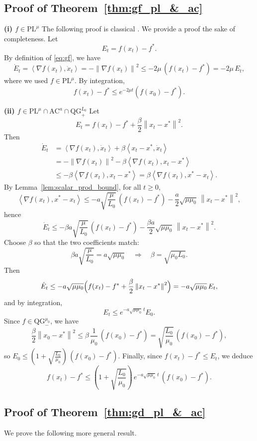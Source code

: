 \documentclass{article}
\def\pl{{\text{PL}^\mu}}
\newcommand{\bpar}[1]{\left(#1\right)}
\newcommand{\norm}[1]{\left\lVert#1\right\rVert}
\newcommand{\dotprod}[1]{\left< #1\right>}
\newcommand{\ac}{\text{AC}^{a}}
\newcommand{\qg}{\text{QG}_{+}^{L_0}}
\newcommand{\qginff}[1]{\text{QG}_{-}^{#1}}
\theoremstyle{plain}
\theoremstyle{definition}
\theoremstyle{remark}
\begin{document}
\subsection{Proof of Theorem~\ref{thm:gf_pl_&_ac}}\label{app:gf_pl_&_ac}


\textbf{(i) $f \in \pl$ \:} The following proof is classical \cite{polyak2017lyapunov}. We provide a proof the sake of completeness.
Let
\[
E_t = f(x_t)-f^\ast.
\]
By definition of \eqref{eq:gf}, we have
\[
\dot E_t = \dotprod{\nabla f(x_t),\dot x_t}
= -\norm{\nabla f(x_t)}^2
\le -2\mu\,(f(x_t)-f^\ast)
= -2\mu\,E_t,
\]
where we used $f\in\pl$. By integration,
\[
f(x_t)-f^\ast \le e^{-2\mu t}(f(x_0)-f^\ast).
\]

\textbf{(ii) $f \in \pl \cap \ac \cap \qg$ \:}
Let
\[
E_t = f(x_t)-f^\ast + \frac{\beta}{2}\norm{x_t-x^\ast}^2.
\]
Then
\begin{align*}
\dot E_t
&= \dotprod{\nabla f(x_t),\dot x_t} + \beta \dotprod{x_t-x^\ast,\dot x_t}\\
&= -\norm{\nabla f(x_t)}^2 - \beta \dotprod{\nabla f(x_t),x_t-x^\ast}\\
&\le - \beta \dotprod{\nabla f(x_t),x_t-x^\ast}
= \beta \dotprod{\nabla f(x_t),x^\ast-x_t}.
\end{align*}
By Lemma~\ref{lem:scalar_prod_bound}, for all $t\ge 0$,
\[
\dotprod{\nabla f(x_t),x^\ast-x_t}
\le -a\sqrt{\frac{\mu}{L_0}}\,(f(x_t)-f^\ast)
     -\frac{a}{2}\sqrt{\mu\mu_0}\,\norm{x_t-x^\ast}^2,
\]
hence
\[
\dot E_t \le
-\beta a\sqrt{\frac{\mu}{L_0}}\,(f(x_t)-f^\ast)
-\frac{\beta a}{2}\sqrt{\mu\mu_0}\,\norm{x_t-x^\ast}^2.
\]
Choose $\beta$ so that the two coefficients match:
\[
\beta a\sqrt{\frac{\mu}{L_0}} = a\sqrt{\mu\mu_0}
\quad\Longrightarrow\quad
\beta = \sqrt{\mu_0 L_0}.
\]
Then
\[
\dot E_t \le -a\sqrt{\mu\mu_0}\Bigl(f(x_t)-f^\ast + \frac{\beta}{2}\norm{x_t-x^\ast}^2\Bigr)
= -a\sqrt{\mu\mu_0}\,E_t,
\]
and by integration,
\[
E_t \le e^{-a\sqrt{\mu\mu_0}\,t}E_0.
\]
Since $f\in\qginff{\mu_0}$, we have
\[
\frac{\beta}{2}\norm{x_0-x^\ast}^2
\le \beta\,\frac{1}{\mu_0}\,(f(x_0)-f^\ast)
= \sqrt{\frac{L_0}{\mu_0}}\,(f(x_0)-f^\ast),
\]
so $E_0 \le \bpar{1+\sqrt{\frac{L_0}{\mu_0}}}\,(f(x_0)-f^\ast)$.
Finally, since $f(x_t)-f^\ast\le E_t$, we deduce
\[
f(x_t)-f^\ast
\le \bpar{1+\sqrt{\frac{L_0}{\mu_0}}}\,e^{-a\sqrt{\mu\mu_0}\,t}\,(f(x_0)-f^\ast).
\]

\subsection{Proof of Theorem~\ref{thm:gd_pl_&_ac}}\label{app:gd_pl_ac}
We prove the following more general result.
\end{document}
